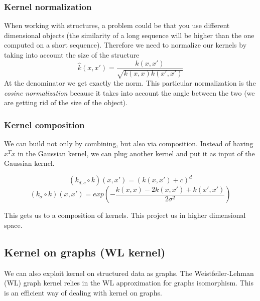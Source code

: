         \subsubsection{Kernel normalization}
            When working with structures, a problem could be that you use different dimensional objects (the similarity of a long sequence will be higher than the one computed on a short sequence). 
            Therefore we need to normalize our kernels by taking into account the size of the structure
            $$\hat{k}(x,x') = \frac{k(x,x')}{\sqrt{k(x,x)k(x',x')}}$$
            At the denominator we get exactly the norm. 
            This particular normalization is the \textit{cosine normalization} because it takes into account the angle between the two (we are getting rid of the size of the object). 

        \subsubsection{Kernel composition}
            We can build not only by combining, but also via composition. Instead of having $x^T x$ in the Gaussian kernel, we can plug another kernel and put it as input of the Gaussian kernel. 
            
    		$$(k_{d,c}\circ k)(x,x') = (k(x,x')+c)^d$$
    		$$(k_\sigma\circ k)(x,x') = exp\left({-\frac{k(x,x)-2k(x,x')+k(x',x')}{2\sigma^2}}\right)$$

            This gets us to a composition of kernels. This project us in higher dimensional space. 

    \subsection{Kernel on graphs (WL kernel)}
        We can also exploit kernel on structured data as graphs. The Weistfeiler-Lehman (WL) graph kernel relies in the WL approximation for graphs isomorphism. This is an efficient way of dealing with kernel on graphs.

